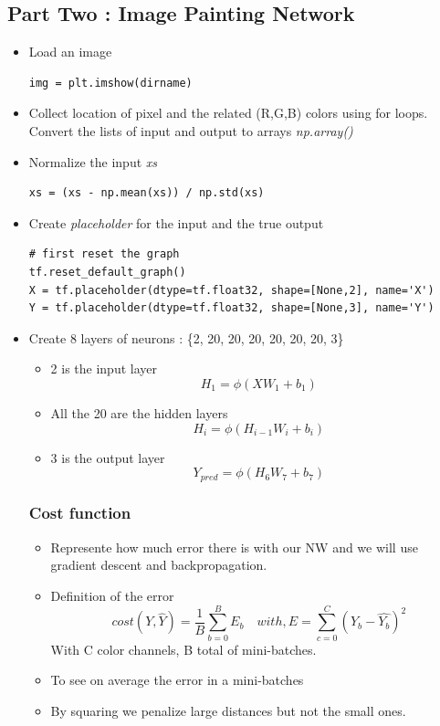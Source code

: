 \documentclass[12pt,a4paper]{article}
\begin{document}
\subsection{Part Two : Image Painting Network}
\begin{itemize}
\item Load an image
\begin{lstlisting}
img = plt.imshow(dirname)
\end{lstlisting}
\item Collect location of pixel and the related (R,G,B) colors using for loops. Convert the lists of input and output to arrays \textit{np.array()}
\item Normalize the input \textit{xs}
\begin{lstlisting}
xs = (xs - np.mean(xs)) / np.std(xs)
\end{lstlisting}
\item Create \textit{placeholder} for the input and the true output
\begin{lstlisting}
# first reset the graph
tf.reset_default_graph()
X = tf.placeholder(dtype=tf.float32, shape=[None,2], name='X')
Y = tf.placeholder(dtype=tf.float32, shape=[None,3], name='Y')
\end{lstlisting}
\item Create 8 layers of neurons : \{2, 20, 20, 20, 20, 20, 20, 3\}
\begin{itemize}
\item 2 is the input layer
\begin{equation}
H_1 = \phi(XW_1 + b_1)
\end{equation}
\item All the 20 are the hidden layers
\begin{equation}
H_{i} = \phi(H_{i-1}W_i + b_i)
\end{equation}
\item 3 is the output layer
\begin{equation}
Y_{pred} = \phi(H_6W_7 + b_7)
\end{equation}
\end{itemize}
\subsubsection{Cost function}
\begin{itemize}
\item Represente how much error there is with our NW and we will use gradient descent and backpropagation.
\item Definition of the error
\begin{equation}
cost(Y, \hat{Y}) = \dfrac{1}{B}\sum_{b=0}^{B}E_b \quad with, E =\sum_{c=0}^{C}(Y_b - \hat{Y_b})^2
\end{equation}
With C color channels, B total of mini-batches.
\item To see on average the error in a mini-batches
\item By squaring we penalize large distances but not the small ones.
\end{itemize}
\end{itemize}
\end{document}
